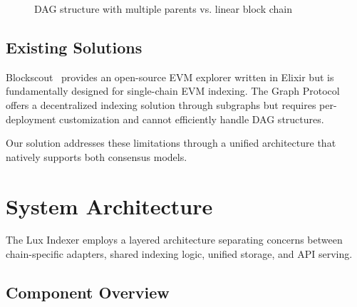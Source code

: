 \documentclass[11pt,twocolumn]{article}
\begin{document}
\begin{figure}[h]
\centering
{}
\caption{DAG structure with multiple parents vs. linear block chain}
\label{fig:dag-vs-linear}
\end{figure}

\subsection{Existing Solutions}

Blockscout~\cite{blockscout} provides an open-source EVM explorer written in Elixir but is fundamentally designed for single-chain EVM indexing. The Graph Protocol~\cite{thegraph} offers a decentralized indexing solution through subgraphs but requires per-deployment customization and cannot efficiently handle DAG structures.

Our solution addresses these limitations through a unified architecture that natively supports both consensus models.

\section{System Architecture}

The Lux Indexer employs a layered architecture separating concerns between chain-specific adapters, shared indexing logic, unified storage, and API serving.

\subsection{Component Overview}
\end{document}
